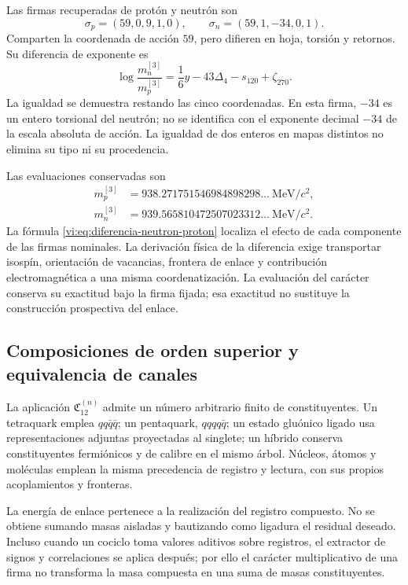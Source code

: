 Las firmas recuperadas de protón y neutrón son
\[
 \sigma_p=(59,0,9,1,0),\qquad
 \sigma_n=(59,1,-34,0,1).
\]
Comparten la coordenada de acción \(59\), pero difieren en hoja,
torsión y retornos. Su diferencia de exponente es
\begin{equation}
 \log\frac{m_n^{[3]}}{m_p^{[3]}}
 =\frac16y-43\Delta_4-s_{120}+\zeta_{270}.
 \label{vi:eq:diferencia-neutron-proton}
\end{equation}
La igualdad se demuestra restando las cinco coordenadas. En esta firma,
\(-34\) es un entero torsional del neutrón; no se identifica con el
exponente decimal \(-34\) de la escala absoluta de acción. La igualdad
de dos enteros en mapas distintos no elimina su tipo ni su procedencia.

Las evaluaciones conservadas son
\begin{align*}
 m_p^{[3]}&=938.271751546984898298\ldots\ \mathrm{MeV}/c^2,\\
 m_n^{[3]}&=939.565810472507023312\ldots\ \mathrm{MeV}/c^2.
\end{align*}
La fórmula \eqref{vi:eq:diferencia-neutron-proton} localiza el efecto de
cada componente de las firmas nominales. La derivación física de la
diferencia exige transportar isospín, orientación de vacancias,
frontera de enlace y contribución electromagnética a una misma coordenatización.
La evaluación del carácter conserva su exactitud bajo la firma fijada;
esa exactitud no sustituye la construcción prospectiva del enlace.

\subsection{Composiciones de orden superior y equivalencia de canales}
\label{vi:subsec:compuestos-superiores}

La aplicación \(\mathfrak C_{12}^{(n)}\) admite un número arbitrario
finito de constituyentes. Un tetraquark emplea \(qq\bar q\bar q\);
un pentaquark, \(qqqq\bar q\); un estado gluónico ligado usa
representaciones adjuntas proyectadas al singlete; un híbrido conserva
constituyentes fermiónicos y de calibre en el mismo árbol. Núcleos,
átomos y moléculas emplean la misma precedencia de registro y lectura,
con sus propios acoplamientos y fronteras.

La energía de enlace pertenece a la realización del registro compuesto.
No se obtiene sumando masas aisladas y bautizando como ligadura el
residual deseado. Incluso cuando un cociclo toma valores aditivos sobre
registros, el extractor de signos y correlaciones se aplica después;
por ello el carácter multiplicativo de una firma no transforma la masa
compuesta en una suma de masas constituyentes.

